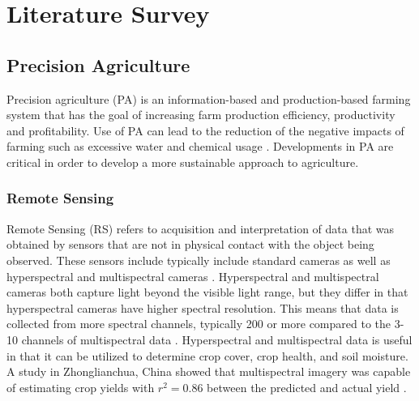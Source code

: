 \chapter{Literature Survey}


\section{Precision Agriculture}
Precision agriculture (PA) is an information-based and production-based farming system that has the goal of increasing farm production efficiency, productivity and profitability. Use of PA can lead to the reduction of the negative impacts of farming such as excessive water and chemical usage \cite{Liaghat2010}. Developments in PA are critical in order to develop a more sustainable approach to agriculture.


\subsection{Remote Sensing}
Remote Sensing (RS) refers to acquisition and interpretation of data that was obtained by sensors that are not in physical contact with the object being observed. These sensors include typically include standard cameras as well as hyperspectral and multispectral cameras \cite{Liaghat2010}. Hyperspectral and multispectral cameras both capture light beyond the visible light range, but they differ in that hyperspectral cameras have higher spectral resolution. This means that data is collected from more spectral channels, typically 200 or more compared to the 3-10 channels of multispectral data \cite{Abuleil}. Hyperspectral and multispectral data is useful in that it can be utilized to determine crop cover, crop health, and soil moisture. A study in Zhonglianchua, China showed that multispectral imagery was capable of estimating crop yields with $r^2 = 0.86$ between the predicted and actual yield \cite{Pan2009}.



